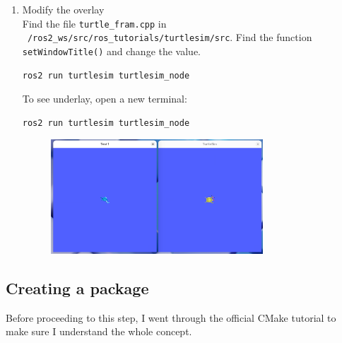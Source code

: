 \documentclass[12pt, a4paper]{article}
\begin{document}
\begin{enumerate}
\newpage
\item Modify the overlay\\
Find the file \texttt{turtle\_fram.cpp} in \\\texttt{~/ros2\_ws/src/ros\_tutorials/turtlesim/src}. Find the function \texttt{setWindowTitle()} and change the value.
\begin{lstlisting}[language=bash]
ros2 run turtlesim turtlesim_node
\end{lstlisting}
To see underlay, open a new terminal:
\begin{lstlisting}[language=bash]
ros2 run turtlesim turtlesim_node
\end{lstlisting}
\begin{figure}[h]
	\centering
	\includegraphics[width=0.75\textwidth]{2/p2.2-2}
\end{figure}
\end{enumerate}

\newpage
\subsection{Creating a package}
Before proceeding to this step, I went through the official CMake tutorial to make sure I understand the whole concept.
\end{document}
